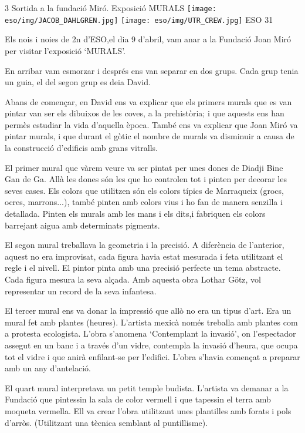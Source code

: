 \begin{news}
{3} %
{Sortida a la fundació Miró.  Exposició MURALS}
{ \noindent\texttt{[image: eso/img/JACOB\_DAHLGREN.jpg]}
\noindent\texttt{[image: eso/img/UTR\_CREW.jpg]}}
{ESO}
{31} %

Els nois i noies de 2n d’ESO,el dia 9 d’abril, vam anar a la Fundació Joan Miró per visitar l’exposició ‘MURALS’.

En arribar vam esmorzar i després ens van separar en dos grups. Cada grup tenia un guia, el del segon grup es deia David.

Abans de començar,  en David ens va explicar que els primers murals que es van pintar van ser els dibuixos de les coves, a la prehistòria; i que aquests ens han permès estudiar la vida d’aquella època.
També ens va explicar que Joan Miró va pintar murals, i que durant el gòtic el nombre de murals va disminuir a causa de la construcció d’edificis amb grans vitralls.

El primer mural que vàrem veure va ser pintat per unes dones de Diadji Bine Gan de Ga. Allà les dones són les que ho controlen tot i pinten per decorar les seves cases.
Els colors que utilitzen són els colors típics de Marraqueix (grocs, ocres, marrons...), també pinten amb colors vius i ho fan de manera senzilla i detallada.
Pinten els murals amb les mans i els dits,i fabriquen els colors barrejant aigua amb determinats pigments.

El segon mural treballava la geometria i la precisió. A diferència de l’anterior, aquest no era improvisat, cada figura havia estat mesurada i feta utilitzant el regle i el nivell.
El pintor pinta amb una precisió perfecte un tema abstracte.
Cada figura mesura la seva alçada. Amb aquesta obra Lothar Götz, vol representar un record de la seva infantesa.

El tercer mural ens va donar la impressió que allò no era un tipus d’art. Era un mural fet amb plantes (heures). L’artista mexicà només treballa amb plantes com a protesta ecologista.
L’obra s’anomena ‘Contemplant la invasió’, on l’espectador assegut en un banc i a través d’un vidre, contempla la invasió d’heura, que ocupa tot el vidre i que anirà enfilant-se per l’edifici.
L’obra s’havia començat a preparar amb un any d’antelació.

El quart mural interpretava un petit temple budista. L’artista va demanar a la Fundació que pintessin la sala de color vermell i que tapessin el terra amb moqueta vermella. Ell va crear l’obra utilitzant unes plantilles amb forats i pols d’arròs. (Utilitzant una tècnica semblant al puntillisme).


\end{news}
